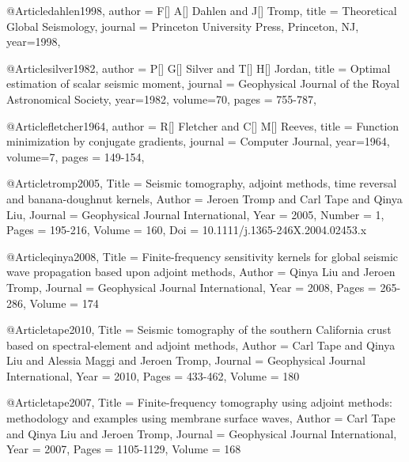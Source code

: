 @Article{dahlen1998,
  author =	 {F[] A[] Dahlen and J[] Tromp},
  title =	 {Theoretical Global Seismology},
  journal =	 {Princeton University Press, Princeton, NJ},
  year=1998,
}

@Article{silver1982,
  author =	 {P[] G[] Silver and T[] H[] Jordan},
  title =	 {Optimal estimation of scalar seismic moment},
  journal =	 {Geophysical Journal of the Royal Astronomical Society},
  year=1982,
  volume=70,
  pages =	 {755-787},
}


@Article{fletcher1964,
  author =	 {R[] Fletcher and C[] M[] Reeves},
  title =	 {Function minimization by conjugate gradients},
  journal =	 {Computer Journal},
  year=1964,
  volume=7,
  pages =	 {149-154},
}

@Article{tromp2005,
  Title                    = {Seismic tomography, adjoint methods, time reversal and banana-doughnut kernels},
  Author                   = {Jeroen Tromp and Carl Tape and Qinya Liu},
  Journal                  = {Geophysical Journal International},
  Year                     = {2005},
  Number                   = {1},
  Pages                    = {195-216},
  Volume                   = {160},
  Doi                      = {10.1111/j.1365-246X.2004.02453.x}
}

@Article{qinya2008,
  Title                    = {Finite-frequency sensitivity kernels for global seismic wave propagation based upon adjoint methods},
  Author                   = {Qinya Liu and Jeroen Tromp},
  Journal                  = {Geophysical Journal International},
  Year                     = {2008},
  Pages                    = {265-286},
  Volume                   = {174}
}


@Article{tape2010,
  Title                    = {Seismic tomography of the southern {C}alifornia crust based on spectral-element and adjoint methods},
  Author                   = {Carl Tape and Qinya Liu and Alessia Maggi and Jeroen Tromp},
  Journal                  = Geophysical Journal International,
  Year                     = {2010},
  Pages                    = {433-462},
  Volume                   = {180}
}

@Article{tape2007,
  Title                    = {Finite-frequency tomography using adjoint methods: methodology and examples using membrane surface waves},
  Author                   = {Carl Tape and Qinya Liu and Jeroen Tromp},
  Journal                  = Geophysical Journal International,
  Year                     = {2007},
  Pages                    = {1105-1129},
  Volume                   = {168}
}


